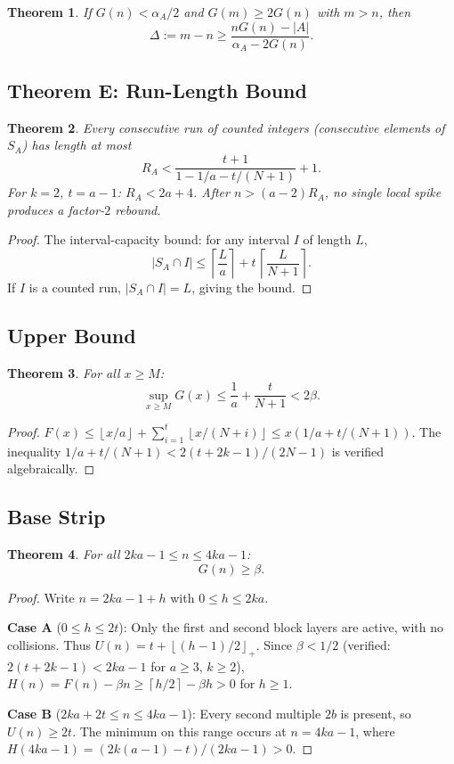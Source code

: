 \documentclass[11pt,a4paper]{article}
\newtheorem{theorem}{Theorem}[section]
\theoremstyle{definition}
\newcommand{\floor}[1]{\left\lfloor #1 \right\rfloor}
\newcommand{\ceil}[1]{\left\lceil #1 \right\rceil}
\begin{document}
\begin{theorem}\label{thm:long-rebound}
If $G(n) < \alpha_A/2$ and $G(m) \geq 2G(n)$ with $m > n$, then
\[
\Delta := m - n \geq \frac{nG(n) - |A|}{\alpha_A - 2G(n)}.
\]
\end{theorem}

\subsection{Theorem E: Run-Length Bound}

\begin{theorem}\label{thm:run-length}
Every consecutive run of counted integers (consecutive elements of 
$S_A$) has length at most
\[
R_A < \frac{t+1}{1 - 1/a - t/(N+1)} + 1.
\]
For $k=2$, $t=a-1$: $R_A < 2a+4$. After $n > (a-2)R_A$, no single 
local spike produces a factor-$2$ rebound.
\end{theorem}

\begin{proof}
The interval-capacity bound: for any interval $I$ of length $L$,
\[
|S_A \cap I| \leq \ceil{\frac{L}{a}} + t\,\ceil{\frac{L}{N+1}}.
\]
If $I$ is a counted run, $|S_A \cap I| = L$, giving the bound.
\end{proof}

\subsection{Upper Bound}

\begin{theorem}\label{thm:upper}
For all $x \geq M$:
\[
\sup_{x \geq M} G(x) \leq \frac{1}{a} + \frac{t}{N+1} < 2\beta.
\]
\end{theorem}

\begin{proof}
$F(x) \leq \floor{x/a} + \sum_{i=1}^{t} \floor{x/(N+i)} 
\leq x(1/a + t/(N+1))$. The inequality 
$1/a + t/(N+1) < 2(t+2k-1)/(2N-1)$ is verified algebraically.
\end{proof}

\subsection{Base Strip}

\begin{theorem}\label{thm:base-strip}
For all $2ka-1 \leq n \leq 4ka-1$:
\[
G(n) \geq \beta.
\]
\end{theorem}

\begin{proof}
Write $n = 2ka - 1 + h$ with $0 \leq h \leq 2ka$.

\textbf{Case A} ($0 \leq h \leq 2t$): Only the first and second block 
layers are active, with no collisions. Thus 
$U(n) = t + \floor{(h-1)/2}_+$. Since $\beta < 1/2$ (verified: 
$2(t+2k-1) < 2ka-1$ for $a \geq 3$, $k \geq 2$), 
$H(n) = F(n) - \beta n \geq \ceil{h/2} - \beta h > 0$ for $h \geq 1$.

\textbf{Case B} ($2ka + 2t \leq n \leq 4ka-1$): Every second multiple 
$2b$ is present, so $U(n) \geq 2t$. The minimum on this range occurs at 
$n = 4ka-1$, where $H(4ka-1) = (2k(a-1)-t)/(2ka-1) > 0$.
\end{proof}
\end{document}
